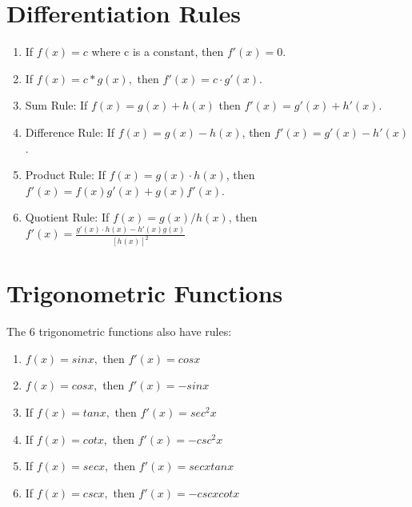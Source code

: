 \section{Differentiation Rules}
\begin{enumerate}
  \item If $f(x) = c$ where c is a constant, then $f'(x) = 0$.\\
  \item If $f(x) = c * g(x),$ then $f'(x) = c \cdot g'(x)$.\\
  \item Sum Rule: If $f(x) = g(x) + h(x)$ then $f'(x) = g'(x) + h'(x)$.\\
  \item Difference Rule: If $f(x) = g(x) - h(x)$, then $f'(x) = g'(x) - h'(x)$.\\
  \item Product Rule: If $f(x) = g(x) \cdot h(x)$, then $f'(x) = f(x)g'(x) + g(x)f'(x).$\\
  \item Quotient Rule: If $f(x) = g(x) / h(x)$, then $f'(x) = \frac{g'(x) \cdot h(x) - h'(x)g(x)}{[h(x)]^2}$
\end{enumerate}

\section{Trigonometric Functions}
The 6 trigonometric functions also have rules:
\begin{enumerate}
  \item$f(x) = sinx,$ then $f'(x) = cosx$\\
  \item $f(x) = cosx,$ then $f'(x) = -sinx$\\
  \item If $f(x) = tanx,$ then $f'(x) = sec^2x$\\
  \item If $f(x) = cotx,$ then $f'(x) = -csc^2x$\\
  \item If $f(x) = secx,$ then $f'(x) = secxtanx$\\
  \item If $f(x) = cscx,$ then $f'(x) = -cscxcotx$\\ 
\end{enumerate}

